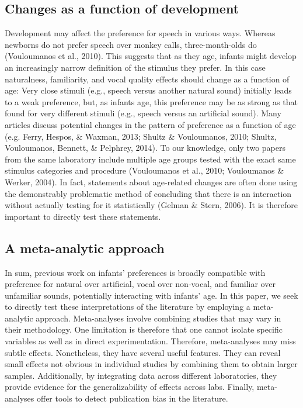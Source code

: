 \documentclass[man,floatsintext]{apa6}
\begin{document}
\hypertarget{changes-as-a-function-of-development}{%
\subsection{Changes as a function of development}\label{changes-as-a-function-of-development}}

Development may affect the preference for speech in various ways. Whereas newborns do not prefer speech over monkey calls, three-month-olds do (Vouloumanos et al., 2010). This suggests that as they age, infants might develop an increasingly narrow definition of the stimulus they prefer. In this case naturalness, familiarity, and vocal quality effects should change as a function of age: Very close stimuli (e.g., speech versus another natural sound) initially leads to a weak preference, but, as infants age, this preference may be as strong as that found for very different stimuli (e.g., speech versus an artificial sound).
Many articles discuss potential changes in the pattern of preference as a function of age (e.g. Ferry, Hespos, \& Waxman, 2013; Shultz \& Vouloumanos, 2010; Shultz, Vouloumanos, Bennett, \& Pelphrey, 2014). To our knowledge, only two papers from the same laboratory include multiple age groups tested with the exact same stimulus categories and procedure (Vouloumanos et al., 2010; Vouloumanos \& Werker, 2004). In fact, statements about age-related changes are often done using the demonstrably problematic method of concluding that there is an interaction without actually testing for it statistically (Gelman \& Stern, 2006). It is therefore important to directly test these statements.

\hypertarget{a-meta-analytic-approach}{%
\subsection{A meta-analytic approach}\label{a-meta-analytic-approach}}

In sum, previous work on infants' preferences is broadly compatible with preference for natural over artificial, vocal over non-vocal, and familiar over unfamiliar sounds, potentially interacting with infants' age. In this paper, we seek to directly test these interpretations of the literature by employing a meta-analytic approach.
Meta-analyses involve combining studies that may vary in their methodology. One limitation is therefore that one cannot isolate specific variables as well as in direct experimentation. Therefore, meta-analyses may miss subtle effects. Nonetheless, they have several useful features. They can reveal small effects not obvious in individual studies by combining them to obtain larger samples. Additionally, by integrating data across different laboratories, they provide evidence for the generalizability of effects across labs. Finally, meta-analyses offer tools to detect publication bias in the literature.
\end{document}
